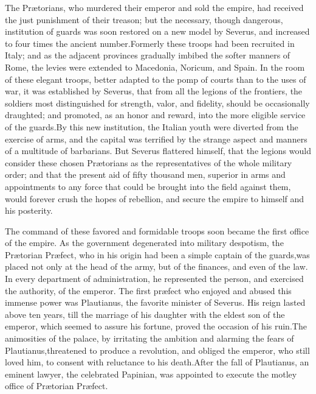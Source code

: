 
The Prætorians, who murdered their emperor and sold the empire,
had received the just punishment of their treason; but the
necessary, though dangerous, institution of guards was soon
restored on a new model by Severus, and increased to four times
the ancient number.\footnotemark[66] Formerly these troops had been recruited
in Italy; and as the adjacent provinces gradually imbibed the
softer manners of Rome, the levies were extended to Macedonia,
Noricum, and Spain. In the room of these elegant troops, better
adapted to the pomp of courts than to the uses of war, it was
established by Severus, that from all the legions of the
frontiers, the soldiers most distinguished for strength, valor,
and fidelity, should be occasionally draughted; and promoted, as
an honor and reward, into the more eligible service of the
guards.\footnotemark[67] By this new institution, the Italian youth were
diverted from the exercise of arms, and the capital was terrified
by the strange aspect and manners of a multitude of barbarians.
But Severus flattered himself, that the legions would consider
these chosen Prætorians as the representatives of the whole
military order; and that the present aid of fifty thousand men,
superior in arms and appointments to any force that could be
brought into the field against them, would forever crush the
hopes of rebellion, and secure the empire to himself and his
posterity.



The command of these favored and formidable troops soon became
the first office of the empire. As the government degenerated
into military despotism, the Prætorian Præfect, who in his origin
had been a simple captain of the guards,\footnotemark[671] was placed not only
at the head of the army, but of the finances, and even of the
law. In every department of administration, he represented the
person, and exercised the authority, of the emperor. The first
præfect who enjoyed and abused this immense power was Plautianus,
the favorite minister of Severus. His reign lasted above ten
years, till the marriage of his daughter with the eldest son of
the emperor, which seemed to assure his fortune, proved the
occasion of his ruin.\footnotemark[68] The animosities of the palace, by
irritating the ambition and alarming the fears of Plautianus,\footnotemark[681]
threatened to produce a revolution, and obliged the emperor, who
still loved him, to consent with reluctance to his death.\footnotemark[69]
After the fall of Plautianus, an eminent lawyer, the celebrated
Papinian, was appointed to execute the motley office of Prætorian
Præfect.

